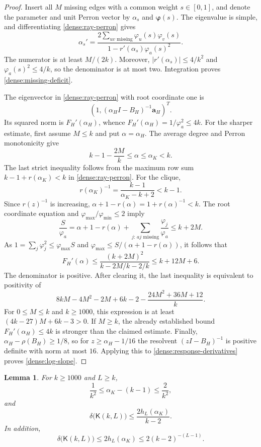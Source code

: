 \documentclass[11pt,a4paper]{article}
\numberwithin{equation}{section}
\newtheorem{lemma}[theorem]{Lemma}
\theoremstyle{definition}
\theoremstyle{remark}
\newcommand{\Kite}{\mathsf{K}}
\begin{document}
\begin{proof}
Insert all $M$ missing edges with a common weight $s\in[0,1]$,
and denote the parameter and unit Perron vector by
$\alpha_s$ and $\boldsymbol\varphi(s)$.
The eigenvalue is simple, and differentiating
\eqref{dense:ray-perron} gives
\[
 \alpha_s'
 =\frac{2\sum_{uv\text{ missing}}\varphi_u(s)\varphi_v(s)}
        {1-r'(\alpha_s)\varphi_a(s)^2}.
\]
The numerator is at least $M/(2k)$.  Moreover,
$|r'(\alpha_s)|\le4/k^2$ and $\varphi_a(s)^2\le4/k$, so the
denominator is at most two.  Integration proves
\eqref{dense:missing-deficit}.

The eigenvector in \eqref{dense:ray-perron} with root coordinate one is
\[
 \left(1,(\alpha_H I-B_H)^{-1}\mathbf a_H\right)^T.
\]
Its squared norm is $F_H'(\alpha_H)$, whence
$F_H'(\alpha_H)=1/\varphi_a^2\le4k$.
For the sharper estimate, first assume $M\le k$ and put
$\alpha=\alpha_H$.  The average degree and Perron monotonicity give
\[
 k-1-\frac{2M}{k}\le\alpha\le\alpha_K<k.
\]
The last strict inequality follows from the maximum row sum
$k-1+r(\alpha_K)<k$ in \eqref{dense:ray-perron}.
For the clique,
\[
 r(\alpha_K)^{-1}
   =\frac{k-1}{\alpha_K-k+2}<k-1.
\]
Since $r(z)^{-1}$ is increasing,
$\alpha+1-r(\alpha)=1+r(\alpha)^{-1}<k$.
The root coordinate equation and
$\varphi_{\max}/\varphi_{\min}\le2$ imply
\[
 \frac{S}{\varphi_a}
 =\alpha+1-r(\alpha)
   +\sum_{j:\,aj\text{ missing}}\frac{\varphi_j}{\varphi_a}
 \le k+2M.
\]
As $1=\sum_j\varphi_j^2\le\varphi_{\max}S$ and
$\varphi_{\max}\le S/(\alpha+1-r(\alpha))$, it follows that
\[
 F_H'(\alpha)
 \le\frac{(k+2M)^2}{k-2M/k-2/k}
 \le k+12M+6.
\]
The denominator is positive.  After clearing it, the last inequality
is equivalent to positivity of
\[
 8kM-4M^2-2M+6k-2
 -\frac{24M^2+36M+12}{k}.
\]
For $0\le M\le k$ and $k\ge1000$, this expression is at least
$(4k-27)M+6k-3>0$.  If $M\ge k$, the already established bound
$F_H'(\alpha_H)\le4k$ is stronger than the claimed estimate.
Finally,
$\alpha_H-\rho(B_H)\ge1/8$, so for
$z\ge\alpha_H-1/16$ the resolvent $(zI-B_H)^{-1}$ is positive
definite with norm at most $16$.  Applying this to
\eqref{dense:response-derivatives} proves
\eqref{dense:log-slope}.
\end{proof}

\begin{lemma}\label{dense:clique-benchmark}
For $k\ge1000$ and $L\ge k$,
\begin{equation}\label{dense:clique-parameter}
 \frac1{k^2}\le\alpha_K-(k-1)\le\frac2{k^2},
\end{equation}
and
\begin{equation}\label{dense:sharp-benchmark}
 \delta\bigl(\Kite(k,L)\bigr)
 \le\frac{2h_L(\alpha_K)}{k-2}.
\end{equation}
In addition,
\begin{equation}\label{dense:coarse-benchmark}
 \delta\bigl(\Kite(k,L)\bigr)
 \le2h_L(\alpha_K)\le2(k-2)^{-(L-1)}.
\end{equation}
\end{lemma}
\end{document}
